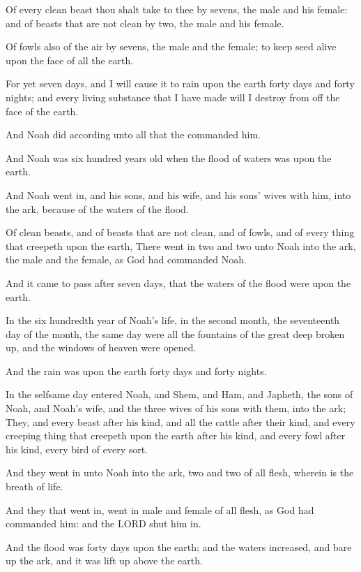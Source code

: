 \verse Of every clean beast thou shalt take to thee by sevens, the male
and his female: and of beasts that are not clean by two, the male and
his female.

\verse Of fowls also of the air by sevens, the male and the female; to
keep seed alive upon the face of all the earth.

\verse For yet seven days, and I will cause it to rain upon the earth
forty days and forty nights; and every living substance that I have
made will I destroy from off the face of the earth.

\verse And Noah did according unto all that the \LORD commanded him.

\verse And Noah was six hundred years old when the flood of waters was
upon the earth.

\verse And Noah went in, and his sons, and his wife, and his sons' wives
with him, into the ark, because of the waters of the flood.

\verse Of clean beasts, and of beasts that are not clean, and of fowls,
and of every thing that creepeth upon the earth, \verse There went in two
and two unto Noah into the ark, the male and the female, as God had
commanded Noah.

\verse And it came to pass after seven days, that the waters of the
flood were upon the earth.

\verse In the six hundredth year of Noah's life, in the second month,
the seventeenth day of the month, the same day were all the fountains
of the great deep broken up, and the windows of heaven were opened.

\verse And the rain was upon the earth forty days and forty nights.

\verse In the selfsame day entered Noah, and Shem, and Ham, and Japheth,
the sons of Noah, and Noah's wife, and the three wives of his sons
with them, into the ark; \verse They, and every beast after his kind,
and all the cattle after their kind, and every creeping thing that
creepeth upon the earth after his kind, and every fowl after his kind,
every bird of every sort.

\verse And they went in unto Noah into the ark, two and two of all
flesh, wherein is the breath of life.

\verse And they that went in, went in male and female of all flesh, as
God had commanded him: and the LORD shut him in.

\verse And the flood was forty days upon the earth; and the waters
increased, and bare up the ark, and it was lift up above the earth.

